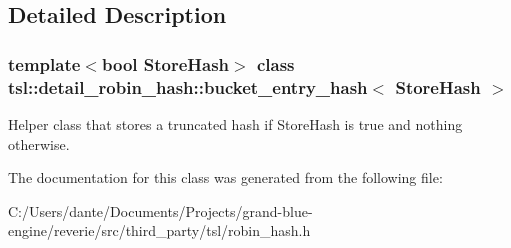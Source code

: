 \subsection{Detailed Description}
\subsubsection*{template$<$bool Store\+Hash$>$\newline
class tsl\+::detail\+\_\+robin\+\_\+hash\+::bucket\+\_\+entry\+\_\+hash$<$ Store\+Hash $>$}

Helper class that stores a truncated hash if Store\+Hash is true and nothing otherwise. 

The documentation for this class was generated from the following file\+:\begin{DoxyCompactItemize}
\item 
C\+:/\+Users/dante/\+Documents/\+Projects/grand-\/blue-\/engine/reverie/src/third\+\_\+party/tsl/robin\+\_\+hash.\+h\end{DoxyCompactItemize}
